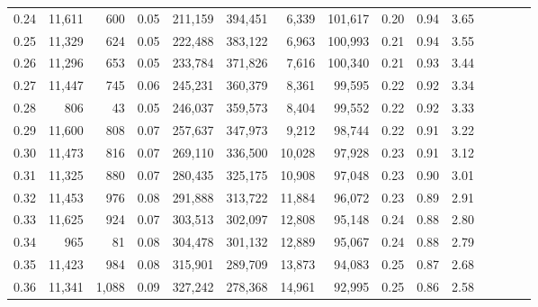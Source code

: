 \begin{tabular}{rrrcrrrrrrrrrrr}
0.24 &  11,611 &    600 &                                       0.05 &  211,159 &  394,451 &    6,339 &  101,617 &  0.20 &  0.94 &                         3.65 \\
0.25 &  11,329 &    624 &                                       0.05 &  222,488 &  383,122 &    6,963 &  100,993 &  0.21 &  0.94 &                         3.55 \\
0.26 &  11,296 &    653 &                                       0.05 &  233,784 &  371,826 &    7,616 &  100,340 &  0.21 &  0.93 &                         3.44 \\
0.27 &  11,447 &    745 &                                       0.06 &  245,231 &  360,379 &    8,361 &   99,595 &  0.22 &  0.92 &                         3.34 \\
0.28 &     806 &     43 &                                       0.05 &  246,037 &  359,573 &    8,404 &   99,552 &  0.22 &  0.92 &                         3.33 \\
0.29 &  11,600 &    808 &                                       0.07 &  257,637 &  347,973 &    9,212 &   98,744 &  0.22 &  0.91 &                         3.22 \\
0.30 &  11,473 &    816 &                                       0.07 &  269,110 &  336,500 &   10,028 &   97,928 &  0.23 &  0.91 &                         3.12 \\
0.31 &  11,325 &    880 &                                       0.07 &  280,435 &  325,175 &   10,908 &   97,048 &  0.23 &  0.90 &                         3.01 \\
0.32 &  11,453 &    976 &                                       0.08 &  291,888 &  313,722 &   11,884 &   96,072 &  0.23 &  0.89 &                         2.91 \\
0.33 &  11,625 &    924 &                                       0.07 &  303,513 &  302,097 &   12,808 &   95,148 &  0.24 &  0.88 &                         2.80 \\
0.34 &     965 &     81 &                                       0.08 &  304,478 &  301,132 &   12,889 &   95,067 &  0.24 &  0.88 &                         2.79 \\
0.35 &  11,423 &    984 &                                       0.08 &  315,901 &  289,709 &   13,873 &   94,083 &  0.25 &  0.87 &                         2.68 \\
0.36 &  11,341 &  1,088 &                                       0.09 &  327,242 &  278,368 &   14,961 &   92,995 &  0.25 &  0.86 &                         2.58 \\

\end{tabular}
